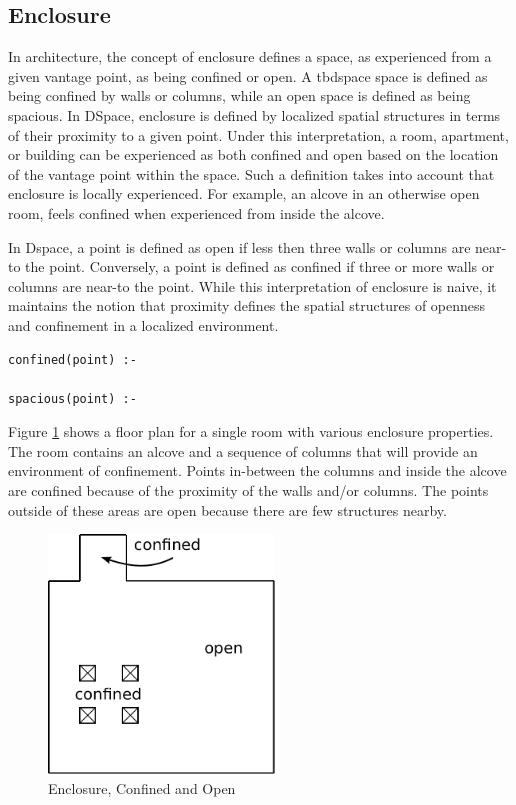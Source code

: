 \documentclass[12pt]{ucthesis}
\begin{document}
\subsection{Enclosure} 
In architecture, the concept of enclosure defines a space, as experienced from a given vantage point, as being confined or open. A tbdspace space is defined as being confined by walls or columns, while an open space is defined as being spacious. In DSpace, enclosure is defined by localized spatial structures in terms of their proximity to a given point. Under this interpretation, a room, apartment, or building can be experienced as both confined and open based on the location of the vantage point within the space. Such a definition takes into account that enclosure is locally experienced. For example, an alcove in an otherwise open room, feels confined when experienced from inside the alcove.

In Dspace, a point is defined as open if less then three walls or columns are near-to the point. Conversely, a point is defined as confined if three or more walls or columns are near-to the point. While this interpretation of enclosure is naive, it maintains the notion that proximity defines the spatial structures of openness and confinement in a localized environment.   

\begin{verbatim}
confined(point) :-  

spacious(point) :-

\end{verbatim} 

Figure \ref{enclosure} shows a floor plan for a single room with various enclosure properties. The room contains an alcove and a sequence of columns that will provide an environment of confinement. Points in-between the columns and inside the alcove are confined because of the proximity of the walls and/or columns. The points outside of these areas are open because there are few structures nearby.

\begin{figure}[H]
\centering
\includegraphics[width=60mm]{spacious-confined}
\caption{Enclosure, Confined and Open}
\label{enclosure}
\end{figure}
\end{document}

